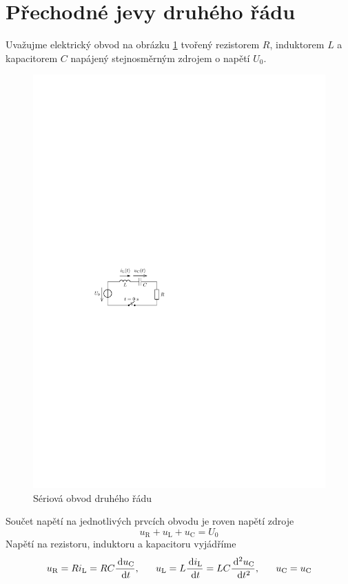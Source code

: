 \section{Přechodné jevy druhého řádu}

Uvažujme elektrický obvod na obrázku \ref{fig:druhy_rad_rlc} tvořený rezistorem $R$, induktorem $L$ a kapacitorem $C$ napájený stejnosměrným zdrojem o napětí $U_0$. 
\begin{figure}[h!]
\centering
\includegraphics[]{prechodne_jevy/druhy_rad/rlc.pdf}
\caption{Sériová obvod druhého řádu}
\label{fig:druhy_rad_rlc}
\end{figure}
Součet napětí na jednotlivých prvcích obvodu je roven napětí zdroje
$$
u_\mathrm{R} + u_\mathrm{L} + u_\mathrm{C} = U_0
$$
Napětí na rezistoru, induktoru a kapacitoru vyjádříme
$$
u_\mathrm{R} = Ri_\mathrm{L} = RC \frac{\,\mathrm{d} u_\mathrm{C}}{\,\mathrm{d} t},~~~~~
u_\mathrm{L} = L \frac{\,\mathrm{d} i_\mathrm{L}}{\,\mathrm{d} t} = LC \frac{\,\mathrm{d}^2 u_\mathrm{C}}{\,\mathrm{d} t^2},~~~~~u_\mathrm{C} = u_\mathrm{C}
$$
